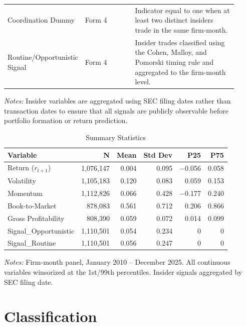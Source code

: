 \documentclass{article}
\begin{document}
\begin{table}[h!]
\begin{tabular}{p{0.24\linewidth}p{0.22\linewidth}p{0.45\linewidth}}
Coordination Dummy & Form 4 & Indicator equal to one when at least two distinct insiders trade in the same firm-month. \\
Routine/Opportunistic Signal & Form 4 & Insider trades classified using the Cohen, Malloy, and Pomorski timing rule and aggregated to the firm-month level. \\
\bottomrule
\end{tabular}
\begin{minipage}{\linewidth}
\vspace{2pt}
\small\textit{Notes:} Insider variables are aggregated using SEC filing dates rather than transaction dates to ensure that all signals are publicly observable before portfolio formation or return prediction.
\end{minipage}
\end{table}

\begin{table}[H]
\centering
\caption{Summary Statistics}
\label{tab:summary}
\small
\begin{tabular}{lrrrrr}
\toprule
Variable & N & Mean & Std Dev & P25 & P75 \\
\midrule
Return ($r_{t+1}$)    & 1,076,147 & 0.004 & 0.095 & $-$0.056 & 0.058 \\
Volatility            & 1,105,183 & 0.120 & 0.083 & 0.059    & 0.153 \\
Momentum              & 1,112,826 & 0.066 & 0.428 & $-$0.177 & 0.240 \\
Book-to-Market        &   878,083 & 0.561 & 0.712 & 0.206    & 0.866 \\
Gross Profitability   &   808,390 & 0.059 & 0.072 & 0.014    & 0.099 \\
Signal\_Opportunistic & 1,110,501 & 0.054 & 0.234 & 0        & 0     \\
Signal\_Routine       & 1,110,501 & 0.056 & 0.247 & 0        & 0     \\
\bottomrule
\end{tabular}
\begin{minipage}{\linewidth}
\vspace{2pt}
\small\textit{Notes:} Firm-month panel, January 2010 -- December 2025. All continuous variables winsorized at the 1st/99th percentiles. Insider signals aggregated by SEC filing date.
\end{minipage}
\end{table}

\section{Classification}
\end{document}
